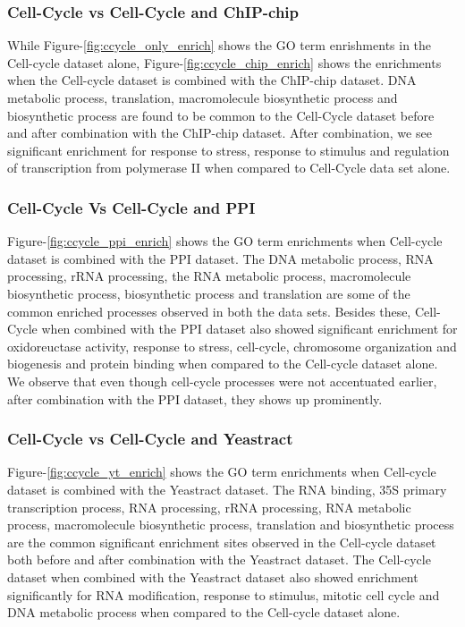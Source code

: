 \subsubsection{Cell-Cycle vs Cell-Cycle and ChIP-chip} 
While Figure-\ref{fig:ccycle_only_enrich} shows the GO term enrishments in the Cell-cycle dataset alone, Figure-\ref{fig:ccycle_chip_enrich} shows the enrichments 
when the Cell-cycle dataset is combined with the ChIP-chip dataset. DNA metabolic process, translation, macromolecule biosynthetic process and biosynthetic process 
are found to be common to the Cell-Cycle dataset before and after combination with the 
ChIP-chip dataset. After combination, we see significant enrichment for response to stress, response to stimulus and regulation of transcription from polymerase II when compared 
to Cell-Cycle data set alone.

\subsubsection{Cell-Cycle Vs Cell-Cycle and PPI} 
Figure-\ref{fig:ccycle_ppi_enrich} shows the GO term enrichments when Cell-cycle dataset is combined with the PPI dataset. The DNA metabolic process, RNA processing, rRNA processing, the RNA metabolic process, macromolecule biosynthetic process, biosynthetic process and translation are 
some of the common enriched processes observed in both the data sets. Besides these, Cell-Cycle when combined with the PPI dataset also showed significant enrichment for 
oxidoreuctase activity, response to stress, cell-cycle, chromosome organization and biogenesis and protein binding 
when compared to the Cell-cycle dataset alone. We observe that even though cell-cycle processes were not accentuated earlier, after combination with the PPI dataset, 
they shows up prominently. 

\subsubsection{Cell-Cycle vs Cell-Cycle and Yeastract} 
Figure-\ref{fig:ccycle_yt_enrich} shows the GO term enrichments when Cell-cycle dataset is combined with the Yeastract dataset. The RNA binding, 
35S primary transcription process, RNA processing, rRNA processing, RNA metabolic process, macromolecule biosynthetic process, 
translation and biosynthetic process are the common significant enrichment sites observed in the Cell-cycle dataset both before and after combination with the Yeastract dataset. 
The Cell-cycle dataset when combined with the Yeastract dataset also showed enrichment significantly for RNA modification, response to stimulus, mitotic cell cycle 
and DNA metabolic process when compared to the Cell-cycle dataset alone. 

